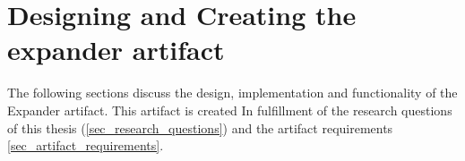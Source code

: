 \section{Designing and Creating the expander artifact} \label{sec_generator_artifact}

The following sections discuss the design, implementation and functionality of the
Expander artifact. This artifact is created In fulfillment of the research questions of
this thesis (\ref{sec_research_questions}) and the artifact requirements
\ref{sec_artifact_requirements}. 









